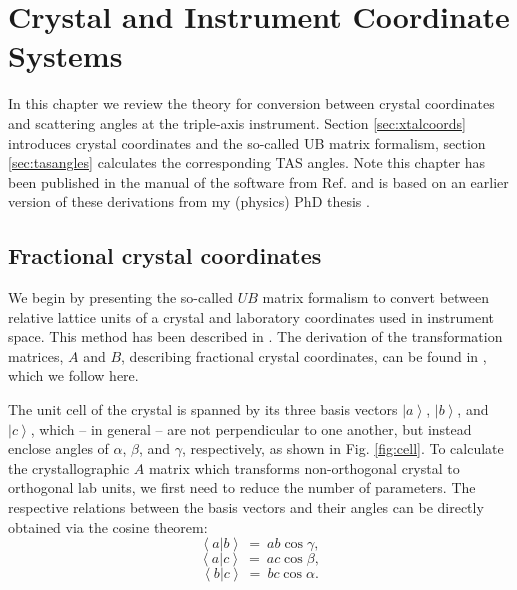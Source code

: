 %
%

\chapter{Crystal and Instrument Coordinate Systems}
\label{ch:xtal}

In this chapter we review the theory for conversion between crystal coordinates and scattering angles at the triple-axis instrument. Section \ref{sec:xtalcoords} introduces crystal coordinates and the so-called UB matrix formalism, section \ref{sec:tasangles} calculates the corresponding TAS angles. Note this chapter has been published in the manual of the software from Ref. \cite{Takin2021} and is based on an earlier version of these derivations from my (physics) PhD thesis \cite[pp. 139-143]{PhDWeber}.


\section{Fractional crystal coordinates \label{sec:xtalcoords}}

We begin by presenting the so-called $UB$ matrix formalism to convert between relative lattice units of a crystal and laboratory coordinates used in instrument space. This method has been described in \cite{Lumsden2005}. The derivation of the transformation matrices, $A$ and $B$, describing fractional crystal coordinates, can be found in \cite{wiki_fractional}, which we follow here.

The unit cell of the crystal is spanned by its three basis vectors $\left| a \right>$, $\left| b \right>$, and $\left| c \right>$, which -- in general -- are not perpendicular to one another, but instead enclose angles of $\alpha$, $\beta$, and $\gamma$, respectively, as shown in Fig. \ref{fig:cell}. 
To calculate the crystallographic $A$ matrix which transforms non-orthogonal crystal to orthogonal lab units, we first need to reduce the number of parameters.
The respective relations between the basis vectors and their angles can be directly obtained via the cosine theorem:
\begin{equation} \left< a | b \right > \ =\  ab \cos \gamma, \label{ab} \end{equation}
\begin{equation} \left< a | c \right > \ =\  ac \cos \beta, \label{ac} \end{equation}
\begin{equation} \left< b | c \right > \ =\  bc \cos \alpha. \label{bc} \end{equation}

